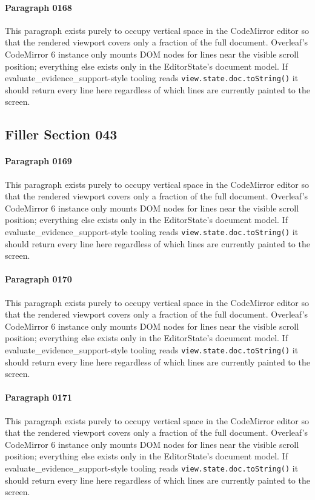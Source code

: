 \documentclass{article}
\begin{document}
\paragraph{Paragraph 0168}
This paragraph exists purely to occupy vertical space in the CodeMirror editor so that the rendered viewport covers only a fraction of the full document. Overleaf's CodeMirror 6 instance only mounts DOM nodes for lines near the visible scroll position; everything else exists only in the EditorState's document model. If evaluate\_evidence\_support-style tooling reads \texttt{view.state.doc.toString()} it should return every line here regardless of which lines are currently painted to the screen.

\subsection{Filler Section 043}
\paragraph{Paragraph 0169}
This paragraph exists purely to occupy vertical space in the CodeMirror editor so that the rendered viewport covers only a fraction of the full document. Overleaf's CodeMirror 6 instance only mounts DOM nodes for lines near the visible scroll position; everything else exists only in the EditorState's document model. If evaluate\_evidence\_support-style tooling reads \texttt{view.state.doc.toString()} it should return every line here regardless of which lines are currently painted to the screen.

\paragraph{Paragraph 0170}
This paragraph exists purely to occupy vertical space in the CodeMirror editor so that the rendered viewport covers only a fraction of the full document. Overleaf's CodeMirror 6 instance only mounts DOM nodes for lines near the visible scroll position; everything else exists only in the EditorState's document model. If evaluate\_evidence\_support-style tooling reads \texttt{view.state.doc.toString()} it should return every line here regardless of which lines are currently painted to the screen.

\paragraph{Paragraph 0171}
This paragraph exists purely to occupy vertical space in the CodeMirror editor so that the rendered viewport covers only a fraction of the full document. Overleaf's CodeMirror 6 instance only mounts DOM nodes for lines near the visible scroll position; everything else exists only in the EditorState's document model. If evaluate\_evidence\_support-style tooling reads \texttt{view.state.doc.toString()} it should return every line here regardless of which lines are currently painted to the screen.
\end{document}
